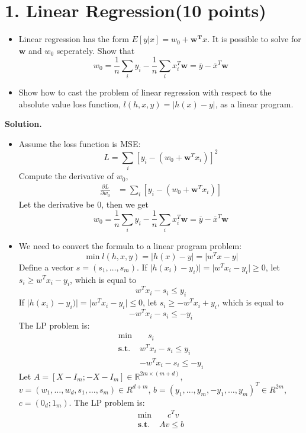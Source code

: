 \documentclass[12pt]{article}%
\begin{document}
	\section*{1. Linear Regression(10 points)}
	\begin{itemize}
		\item Linear regression has the form $E[y\lvert x] = w_{0} + \bm{w^{T}}x$. It is possible to solve for $\bm{w}$ and $w_{0}$ seperately. Show that
		\begin{equation*}
		w_{0} = \frac{1}{n}\sum_{i}y_{i} - \frac{1}{n}\sum_{i}x_{i}^{T}\bm{w} = \overline{y} - \overline{x}^{T}\bm{w} 
		\end{equation*}
		
		
		\item Show how to cast the problem of linear regression with respect to the absolute value loss function, $l(h,x,y)=\lvert h(x) - y \rvert$, as a linear program.
	\end{itemize}
	\textbf{Solution.}
	\begin{itemize}
		\item 
			Assume the loss function is MSE:
			\[ L = \sum_i[y_i - (w_0 + \mathbf{w}^T x_i)]^2 \]
			Compute the derivative of $w_0$,
			\begin{align*}
				\frac{\partial L}{\partial w_0} &= \sum_i [y_i - (w_0 + \mathbf{w}^T x_i)] 
			\end{align*}
			Let the derivative be 0, then we get
			\[ w_{0} = \frac{1}{n}\sum_{i}y_{i} - \frac{1}{n}\sum_{i}x_{i}^{T}\bm{w} = \overline{y} - \overline{x}^{T}\bm{w} \]
		\item
			 We need to convert the formula to a linear program problem:
			 \[ \min l(h,x,y)=\lvert h(x) - y \rvert = \lvert w^T x - y \rvert \]
			 Define a vector $s = (s_1, \dots, s_m)$. 
			 If $\lvert h(x_i) - y_i) \rvert = \lvert w^T x_i - y_i \rvert \ge 0$, let $s_i \ge w^T x_i - y_i$, which is equal to \[ w^T x_i - s_i \le y_i \]
			 If $\lvert h(x_i) - y_i) \rvert = \lvert w^T x_i - y_i \rvert \le 0$, let $s_i \ge - w^T x_i + y_i$, which is equal to \[ -w^T x_i - s_i \le -y_i \]
			 The LP problem is:
			 \begin{align*}
				 \min & \quad s_i \\
				 \textbf{s.t. } & w^T x_i - s_i \le y_i \\
								& -w^T x_i - s_i \le -y_i 
			 \end{align*}
			 Let $A = [X - I_m; -X - I_m] \in \mathbb{R}^{2m\times(m+d)}$, $v = (w_1, \dots, w_d, s_1, \dots, s_m)\in R^{d+m}$, $b = (y_1, \dots, y_m, -y_1, \dots, y_m)^T \in R^{2m}$, $c = (0_d; 1_m)$. The LP problem is:
			 \begin{align*}
				 \min & \quad c^T v \\
				 \textbf{s.t. } & Av \le b
			 \end{align*}
			 
			
	\end{itemize}
	
\end{document}
